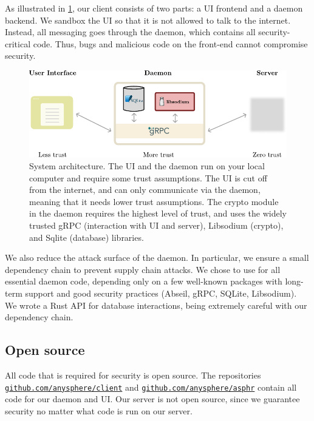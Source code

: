 As illustrated in \cref{fig:systemdiagram}, our client consists of two parts: a UI frontend and a daemon backend. We sandbox the UI so that it is not allowed to talk to the internet. Instead, all messaging goes through the daemon, which contains all security-critical code. Thus, bugs and malicious code on the front-end cannot compromise security.
\begin{figure}[t!]
    \centering
    \includegraphics[width=\textwidth]{sysdiagramalt.pdf}
\caption{System architecture. The UI and the daemon run on your local computer and require some trust assumptions. The UI is cut off from the internet, and can only communicate via the daemon, meaning that it needs lower trust assumptions. The crypto module in the daemon requires the highest level of trust, and uses the widely trusted gRPC (interaction with UI and server), Libsodium (crypto), and Sqlite (database) libraries.}
\label{fig:systemdiagram}
\end{figure}

We also reduce the attack surface of the daemon. In particular, we ensure a small dependency chain to prevent supply chain attacks. We chose to use \Cpp for all essential daemon code, depending only on a few well-known packages with long-term support and good security practices (Abseil, gRPC, SQLite, Libsodium). We wrote a Rust API for database interactions, being extremely careful with our dependency chain. 


\subsection{Open source}

All code that is required for security is open source. The repositories \\ {\tt \href{https://github.com/anysphere/client}{github.com/anysphere/client}} and  {\tt \href{https://github.com/anysphere/asphr}{github.com/anysphere/asphr}} contain all code for our daemon and UI. Our server is not open source, since we guarantee security no matter what code is run on our server. 

